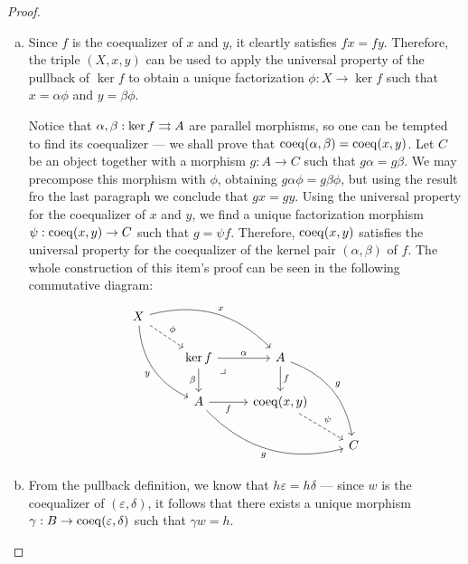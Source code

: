 \begin{proof}
\begin{enumerate}[(a)]\setlength\itemsep{0em}
\item Since \(f\) is the coequalizer of \(x\) and \(y\), it cleartly satisfies
  \(f x = f y\). Therefore, the triple \((X, x, y)\) can be used to apply the
  universal property of the pullback of \(\ker f\) to obtain a unique
  factorization \(\phi: X \to \ker f\) such that \(x = \alpha \phi\) and
  \(y = \beta \phi\).

  Notice that \(\alpha, \beta: \ker f \rightrightarrows A\) are parallel morphisms, so one
  can be tempted to find its coequalizer --- we shall prove that
  \(\operatorname{coeq}(\alpha, \beta) = \operatorname{coeq}(x, y)\). Let \(C\) be an object together with a
  morphism \(g: A \to C\) such that \(g \alpha = g \beta\). We may precompose
  this morphism with \(\phi\), obtaining \(g \alpha \phi = g \beta \phi\), but
  using the result fro the last paragraph we conclude that \(g x = g y\). Using
  the universal property for the coequalizer of \(x\) and \(y\), we find a
  unique factorization morphism \(\psi: \operatorname{coeq}(x, y) \to C\) such that
  \(g = \psi f\). Therefore, \(\operatorname{coeq}(x, y)\) satisfies the universal property
  for the coequalizer of the kernel pair \((\alpha, \beta)\) of \(f\). The whole
  construction of this item's proof can be seen in the following commutative
  diagram:
  \[
  \begin{tikzcd}
  X \ar[rd, dashed, "\phi"]
  \ar[rrd, bend left, "x"]
  \ar[drd, bend right, "y"'] & & &
  \\
  &\ker f \ar[r, "\alpha"]
  \ar[rd, phantom, "\lrcorner", very near start]
  \ar[d, "\beta"']
  &A \ar[d, "f"] \ar[drd, bend left, "g"]
  &
  \\
  &A \ar[r, "f"'] \ar[rrd, "g"', bend right]
  &\Coeq(x, y) \ar[rd, dashed, "\psi"]
  &
  \\
  & & &C
  \end{tikzcd}
  \]

\item From the pullback definition, we know that \(h \varepsilon = h \delta\)
  --- since \(w\) is the coequalizer of \((\varepsilon, \delta)\), it follows
  that there exists a unique morphism
  \(\gamma: B \to \operatorname{coeq}(\varepsilon, \delta)\) such that \(\gamma w = h\).


\end{enumerate}
\end{proof}
